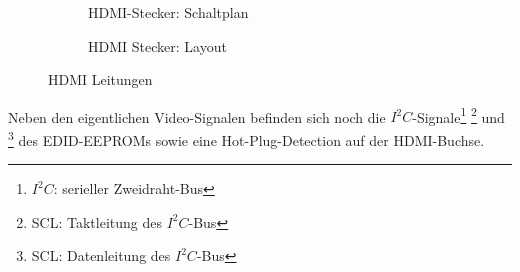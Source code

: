 \begin{figure}[htbp]
        \centering
        \begin{subfigure}[htp]{0.48\textwidth}
%			
			\fbox{	\texttt{[image: TeilB/hdmi\_sch.png]}}
            \caption{HDMI-Stecker: Schaltplan}
            \label{fig:teilb_hdmi_sch}
        \end{subfigure}
\quad 
        \begin{subfigure}[htp]{0.48\textwidth}
 			\caption{HDMI Stecker: Layout}
            \label{fig:teilb_hdmi_pcb}
        \end{subfigure}
        \caption{HDMI Leitungen}
        \label{fig:teilb_hdmi}
\end{figure}
Neben den eigentlichen Video-Signalen befinden sich noch die $I^2C$-Signale\footnote{$I^2C$: serieller Zweidraht-Bus} \footnote{SCL: Taktleitung des $I^2C$-Bus} und \footnote{SCL: Datenleitung des $I^2C$-Bus} des EDID-EEPROMs sowie eine Hot-Plug-Detection auf der HDMI-Buchse.
